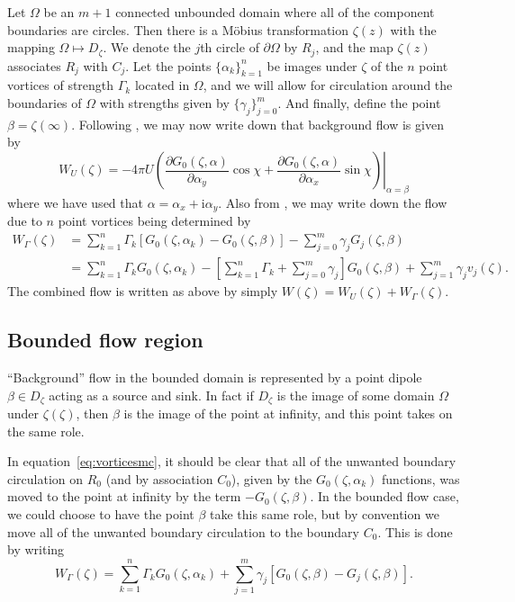 \documentclass[12pt,fleqn]{article}
\renewcommand{\i}{\mathrm{i}}
\begin{document}
Let $\Omega$ be an $m+1$ connected unbounded domain where all of the component boundaries are circles. Then there is a M\"obius transformation $\zeta(z)$ with the mapping $\Omega\mapsto D_\zeta$. We denote the $j$th circle of $\partial\Omega$ by $R_j$, and the map $\zeta(z)$ associates $R_j$ with $C_j$. Let the points $\{\alpha_k\}_{k=1}^n$ be images under $\zeta$ of the $n$ point vortices of strength $\Gamma_k$ located in $\Omega$, and we will allow for circulation around the boundaries of $\Omega$ with strengths given by $\{\gamma_j\}_{j=0}^m$. And finally, define the point $\beta = \zeta(\infty)$. Following \cite{newcalculus}, we may now write down that background flow is given by
\begin{equation}
  W_U(\zeta) = -4\pi U\left. \left( \frac{\partial G_0(\zeta,\alpha)}{\partial \alpha_y}\cos\chi + \frac{\partial G_0(\zeta,\alpha)}{\partial \alpha_x}\sin\chi \right) \right|_{\alpha = \beta}
  \label{eq:backgroudmc}
\end{equation}
where we have used that $\alpha = \alpha_x + \i\alpha_y$. Also from \cite{newcalculus}, we may write down the flow due to $n$ point vortices being determined by
\begin{equation}
  \begin{split}
    W_\Gamma(\zeta) &= \sum_{k=1}^n \Gamma_k \left[ G_0(\zeta,\alpha_k) - G_0(\zeta,\beta) \right] - \sum_{j=0}^m \gamma_j G_j(\zeta,\beta) \\
    &= \sum_{k=1}^n \Gamma_k G_0(\zeta,\alpha_k) - \left[ \sum_{k=1}^n \Gamma_k + \sum_{j=0}^m \gamma_j \right] G_0(\zeta,\beta) + \sum_{j=1}^m \gamma_j v_j(\zeta).
  \end{split}
  \label{eq:vorticesmc}
\end{equation}
The combined flow is written as above by simply $W(\zeta) = W_U(\zeta) + W_\Gamma(\zeta)$.

\subsection{Bounded flow region}
``Background'' flow in the bounded domain is represented by a point dipole $\beta\in D_\zeta$ acting as a source and sink. In fact if $D_\zeta$ is the image of some domain $\Omega$ under $\zeta(\zeta)$, then $\beta$ is the image of the point at infinity, and this point takes on the same role.

In equation~\eqref{eq:vorticesmc}, it should be clear that all of the unwanted boundary circulation on $R_0$ (and by association $C_0$), given by the $G_0(\zeta,\alpha_k)$ functions, was moved to the point at infinity by the term $-G_0(\zeta,\beta)$. In the bounded flow case, we could choose to have the point $\beta$ take this same role, but by convention we move all of the unwanted boundary circulation to the boundary $C_0$. This is done by writing
\begin{equation}
  W_\Gamma(\zeta) = \sum_{k=1}^n \Gamma_k G_0(\zeta,\alpha_k) + \sum_{j=1}^m \gamma_j \left[ G_0(\zeta,\beta) - G_j(\zeta,\beta) \right].
  \label{eq:bvorticesmc}
\end{equation}
\end{document}
